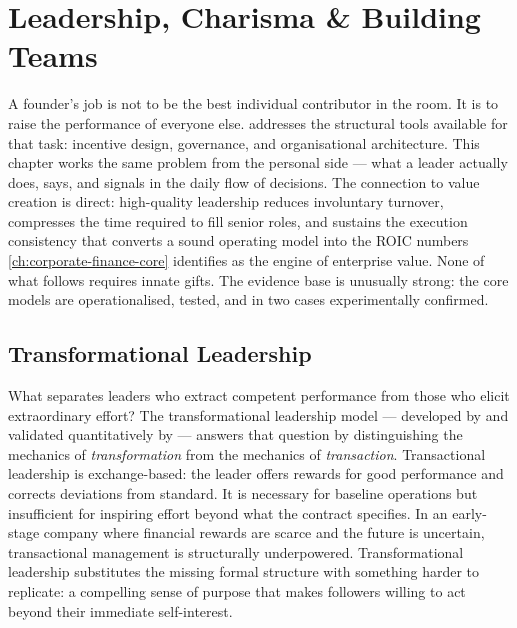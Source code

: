 \chapter{Leadership, Charisma \& Building Teams}\label{ch:leadership-charisma}


A founder's job is not to be the best individual contributor in the room. It is to raise the
performance of everyone else.  addresses the structural tools
available for that task: incentive design, governance, and organisational architecture. This
chapter works the same problem from the personal side --- what a leader actually does, says, and
signals in the daily flow of decisions. The connection to value creation is direct: high-quality
leadership reduces involuntary turnover, compresses the time required to fill senior roles, and
sustains the execution consistency that converts a sound operating model into the ROIC numbers
\cref{ch:corporate-finance-core} identifies as the engine of enterprise value. None of what
follows requires innate gifts. The evidence base is unusually strong: the core models are
operationalised, tested, and in two cases experimentally confirmed.

\section{Transformational Leadership}\label{sec:transformational-leadership}

What separates leaders who extract competent performance from those who elicit extraordinary
effort? The transformational leadership model --- developed by \textcite{bass1985leadership} and
validated quantitatively by \textcite{judge2004transformational} --- answers that question by
distinguishing the mechanics of \emph{transformation} from the mechanics of \emph{transaction}.
Transactional leadership is exchange-based: the leader offers rewards for good performance and
corrects deviations from standard. It is necessary for baseline operations but insufficient for
inspiring effort beyond what the contract specifies. In an early-stage company where financial
rewards are scarce and the future is uncertain, transactional management is structurally
underpowered. Transformational leadership substitutes the missing formal structure with something
harder to replicate: a compelling sense of purpose that makes followers willing to act beyond
their immediate self-interest.

